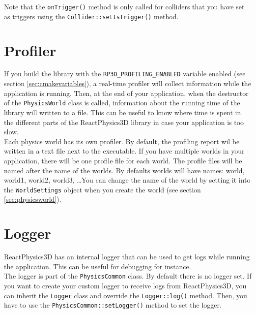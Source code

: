 \documentclass[a4paper,12pt]{article}
\begin{document}
    Note that the \texttt{onTrigger()} method is only called for colliders that you have set as triggers using the \texttt{Collider::setIsTrigger()} method.

    \section{Profiler}
    \label{sec:profiler}

    If you build the library with the \texttt{RP3D\_PROFILING\_ENABLED} variable enabled (see section \ref{sec:cmakevariables}), a real-time profiler
    will collect information while the application is running. Then, at the end of your application, when the destructor of the \texttt{PhysicsWorld}
    class is called, information about the running time of the library will written to a file.
    This can be useful to know where time is spent in the different parts of the ReactPhysics3D library in case your application is too slow. \\

    Each physics world has its own profiler. By default, the profiling report wil be written in a text file next to the executable.
    If you have multiple worlds in your application, there will be one profile file for each world. The profile files will be named after the
    name of the worlds. By defaults worlds will have names: world, world1, world2, world3, \dots You can change the name of the world by
    setting it into the \texttt{WorldSettings} object when you create the world (see section \ref{sec:physicsworld}). \\

    \section{Logger}
    \label{sec:logger}

    ReactPhysics3D has an internal logger that can be used to get logs while running the application. This can be useful for debugging for instance. \\

    The logger is part of the \texttt{PhysicsCommon} class. By default there is no logger set. If you want to create your custom logger to receive logs
    from ReactPhysics3D, you can inherit the \texttt{Logger} class and override the \texttt{Logger::log()} method. Then, you have to use the
    \texttt{PhysicsCommon::setLogger()} method to set the logger. \\
\end{document}
